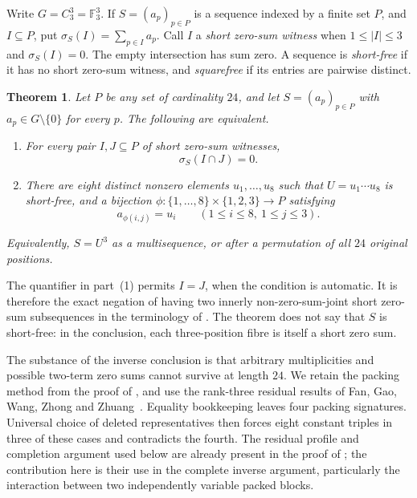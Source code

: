 \documentclass[11pt]{article}
\newtheorem{theorem}{Theorem}[section]
\theoremstyle{definition}
\theoremstyle{remark}
\newcommand{\F}{\mathbb F}
\newcommand{\sig}{\sigma}
\begin{document}
Write $G=C_3^3=\F_3^3$. If $S=(a_p)_{p\in P}$ is a sequence indexed by a
finite set $P$, and $I\subseteq P$, put $\sig_S(I)=\sum_{p\in I}a_p$.
Call $I$ a \emph{short zero-sum witness} when
$1\leq |I|\leq3$ and $\sig_S(I)=0$.
The empty intersection has sum zero. A sequence is \emph{short-free}
if it has no short zero-sum witness, and \emph{squarefree} if its entries
are pairwise distinct.

\begin{theorem}\label{thm:main}
Let $P$ be any set of cardinality $24$, and let $S=(a_p)_{p\in P}$ with
$a_p\in G\setminus\{0\}$ for every $p$. The following are equivalent.
\begin{enumerate}
\item For every pair $I,J\subseteq P$ of short zero-sum witnesses,
\begin{equation}\label{eq:avoid}
                    \sig_S(I\cap J)=0.
\end{equation}
\item There are eight distinct nonzero elements $u_1,\ldots,u_8$ such that
$U=u_1\cdots u_8$ is short-free, and a bijection
$\phi:\{1,\ldots,8\}\times\{1,2,3\}\longrightarrow P$ satisfying
\begin{equation}\label{eq:permutation}
                  a_{\phi(i,j)}=u_i\qquad(1\leq i\leq8,\ 1\leq j\leq3).
\end{equation}
\end{enumerate}
Equivalently, $S=U^3$ as a multisequence, or after a permutation of all
$24$ original positions.
\end{theorem}

The quantifier in part~(1) permits $I=J$, when the condition is automatic.
It is therefore the exact negation of having two innerly
non-zero-sum-joint short zero-sum subsequences in the terminology of
\cite{Gao2024}. The theorem does not say that $S$ is short-free: in the
conclusion, each three-position fibre is itself a short zero sum.

The substance of the inverse conclusion is that arbitrary multiplicities
and possible two-term zero sums cannot survive at length $24$.
We retain the packing method from the proof of
\cite[Lemma 3.3(3)]{Gao2024}, and use the rank-three residual results of
Fan, Gao, Wang, Zhong and Zhuang~\cite{Fan2012}. Equality bookkeeping leaves
four packing signatures. Universal choice of deleted representatives then
forces eight constant triples in three of these cases and contradicts the
fourth. The residual profile and completion argument used below are already
present in the proof of \cite[Lemma 27(3)]{Fan2012}; the contribution here
is their use in the complete inverse argument, particularly the interaction
between two independently variable packed blocks.
\end{document}
